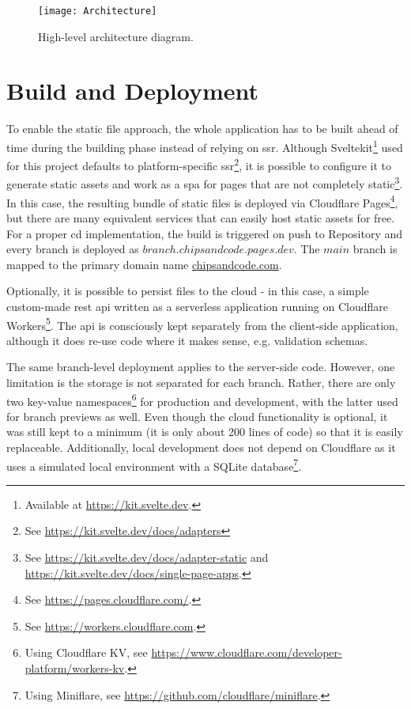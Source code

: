\begin{figure}[H]
    \centering
    \texttt{[image: Architecture]}
    \caption{High-level architecture diagram.}
    \label{fig:design-architecture}
\end{figure}

\section{Build and Deployment}

To enable the static file approach, the whole application has to be built ahead of time during the building phase instead of relying on \gls{ssr}.
Although Sveltekit\footnote{Available at \url{https://kit.svelte.dev}.} used for this project defaults to platform-specific \gls{ssr}\footnote{See \url{https://kit.svelte.dev/docs/adapters}}, it is possible to configure it to generate static assets and work as a \gls{spa} for pages that are not completely static\footnote{See \url{https://kit.svelte.dev/docs/adapter-static} and \url{https://kit.svelte.dev/docs/single-page-apps}.}.
In this case, the resulting bundle of static files is deployed via Cloudflare Pages\footnote{See \url{https://pages.cloudflare.com/}.}, but there are many equivalent services that can easily host static assets for free.
For a proper \gls{cd} implementation, the build is triggered on push to Repository and every branch is deployed as $branch.chipsandcode.pages.dev$.
The $main$ branch is mapped to the primary domain name \href{https://chipsandcode.com/}{chipsandcode.com}.

Optionally, it is possible to persist files to the cloud - in this case, a simple custom-made \gls{rest} \gls{api} written as a serverless application running on Cloudflare Workers\footnote{See \url{https://workers.cloudflare.com}.}.
The \gls{api} is consciously kept separately from the client-side application, although it does re-use code where it makes sense, e.g. validation schemas.

The same branch-level deployment applies to the server-side code.
However, one limitation is the storage is not separated for each branch.
Rather, there are only two key-value namespaces\footnote{Using Cloudflare KV, see \url{https://www.cloudflare.com/developer-platform/workers-kv}.} for production and development, with the latter used for branch previews as well.
Even though the cloud functionality is optional, it was still kept to a minimum (it is only about 200 lines of code) so that it is easily replaceable.
Additionally, local development does not depend on Cloudflare as it uses a simulated local environment with a SQLite database\footnote{Using Miniflare, see \url{https://github.com/cloudflare/miniflare}.}.

